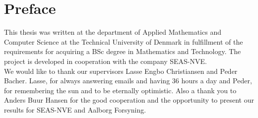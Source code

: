 \chapter{Preface}
This thesis was written at the department of Applied Mathematics and Computer Science at the Technical University of Denmark in fulfillment of the requirements for acquiring a BSc degree in Mathematics and Technology. The project is developed in cooperation with the company SEAS-NVE. \\

\noindent We would like to thank our supervisors Lasse Engbo Christiansen and Peder Bacher. Lasse, for always answering emails and having 36 hours a day and Peder, for remembering the sun and to be eternally optimistic. Also a thank you to Anders Buur Hansen for the good cooperation and the opportunity to present our results for SEAS-NVE and Aalborg Forsyning. 

\vfill

{
\begin{flushright}
    \thesisauthor{}
\end{flushright}
}